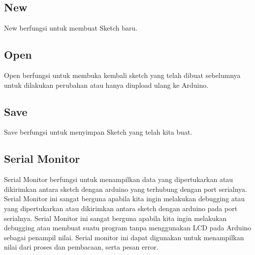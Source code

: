 \subsection{New}
New berfungsi untuk membuat Sketch baru.
\subsection{Open}
Open berfungsi untuk membuka kembali sketch yang telah dibuat sebelumnya untuk dilakukan perubahan atau hanya diupload ulang ke Arduino.
\subsection{Save}
Save berfungsi untuk menyimpan Sketch yang telah kita buat.
\subsection{Serial Monitor}
Serial Monitor berfungsi untuk menampilkan data yang dipertukarkan atau dikirimkan antara sketch dengan arduino yang terhubung dengan port serialnya. Serial Monitor ini sangat berguna apabila kita ingin melakukan debugging atau yang dipertukarkan atau dikirimkan antara sketch dengan arduino pada port serialnya. Serial Monitor ini sangat berguna apabila kita ingin melakukan debugging atau membuat suatu program tanpa menggunakan LCD pada Arduino sebagai penampil nilai. Serial monitor ini dapat digunakan untuk menampilkan nilai dari proses dan pembacaan, serta pesan error.

